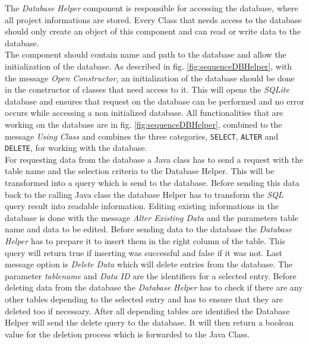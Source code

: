The \textit{Database Helper} component is responsible for accessing the database, where all project informations are stored. Every Class that needs access to the database should only create an object of this component and can read or write data to the database.\\
The component should contain name and path to the database and allow the initialization of the database. As described in fig. \ref{fig:sequenceDBHelper}, with the message \textit{Open Constructor}, an initialization of the database should be done in the constructor of classes that need access to it. This will opens the \textit{SQLite} database and ensures that request on the database can be performed and no error occurs while accessing a non initialized database. All functionalities that are working on the database are in fig. \ref{fig:sequenceDBHelper}, combined to the message \textit{Using Class} and combines the three categories, \texttt{SELECT}, \texttt{ALTER} and \texttt{DELETE}, for working with the database.\\ 
For requesting data from the database a Java class has to send a request with the table name and the selection criteria to the Database Helper. This will be transformed into a query which is send to the database. Before sending this data back to the calling Java class the database Helper has to transform the \textit{SQL} query result into readable information. Editing existing informations in the database is done with the message \textit{Alter Existing Data} and the parameters table name and data to be edited. Before sending data to the database the \textit{Database Helper} has to prepare it to insert them in the right column of the table. This query will return true if inserting was successful and false if it was not. Last message option is \textit{Delete Data} which will delete entries from the database. The parameter \textit{tablename} and \textit{Data ID} are the identifiers for a selected entry. Before deleting data from the database the \textit{Database Helper} has to check if there are any other tables depending to the selected entry and has to ensure that they are deleted too if necessary. After all depending tables are identified the Database Helper will send the delete query to the database. It will then return a boolean value for the deletion process which is forwarded to the Java Class.
